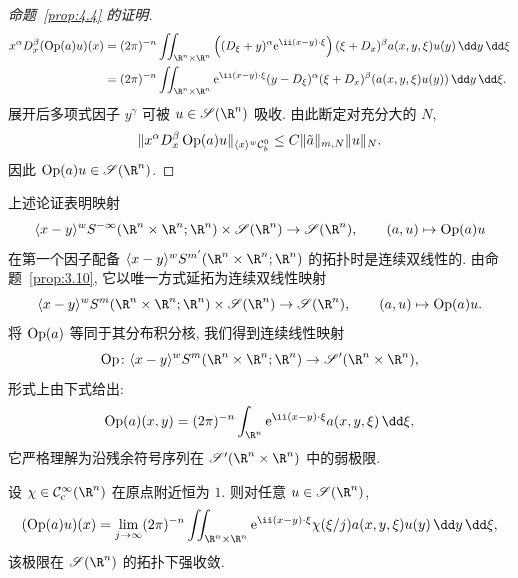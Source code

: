 \begin{proof}[命题~\ref{prop:4.4} 的证明]
\begin{equation}\label{eq:4.21}
    \begin{aligned}
        x^\alpha D_x^\beta (\Op(a) u)(x)
        &= (2\pi)^{-n} \iint_{\R^n \times \R^n} \left( (D_\xi + y)^\alpha \ee^{\ii (x-y) \cdot \xi} \right) (\xi + D_x)^\beta a(x, y, \xi) u(y) \,\dd y \,\dd\xi \\
        &= (2\pi)^{-n} \iint_{\R^n \times \R^n} \ee^{\ii (x-y) \cdot \xi} (y - D_\xi)^\alpha (\xi + D_x)^\beta (a(x, y, \xi) u(y)) \,\dd y \,\dd\xi.
    \end{aligned}
\end{equation}
展开后多项式因子 $y^\gamma$ 可被 $u \in \Schwartz(\R^n)$ 吸收. 由此断定对充分大的 $N$,
\begin{equation}\label{eq:4.22}
    \|x^\alpha D_x^\beta \operatorname{Op}(a) u\|_{\langle x \rangle^w \mathcal{C}_b^0} \le C \|\tilde{a}\|_{m, N} \|u\|_N.
\end{equation}
因此 $\Op(a) u \in \Schwartz(\R^n)$.
\end{proof}

上述论证表明映射
\begin{equation}\label{eq:4.23}
    \langle x - y \rangle^w S^{-\infty}(\R^n \times \R^n; \R^n) \times \Schwartz(\R^n) \to \Schwartz(\R^n), \qquad (a, u) \mapsto \Op(a) u
\end{equation}
在第一个因子配备 $\langle x - y \rangle^w S^{m'}(\R^n \times \R^n; \R^n)$ 的拓扑时是连续双线性的. 由命题~\ref{prop:3.10}, 它以唯一方式延拓为连续双线性映射
\begin{equation}\label{eq:4.24}
    \langle x - y \rangle^w S^m(\R^n \times \R^n; \R^n) \times \Schwartz(\R^n) \to \Schwartz(\R^n), \qquad (a, u) \mapsto \Op(a) u.
\end{equation}
将 $\operatorname{Op}(a)$ 等同于其分布积分核, 我们得到连续线性映射
\begin{equation}\label{eq:4.25}
    \Op \colon \langle x - y \rangle^w S^m(\R^n \times \R^n; \R^n) \to \TempDistr(\R^n \times \R^n),
\end{equation}
形式上由下式给出:
\begin{equation}\label{eq:4.26}
    \Op(a)(x, y) = (2\pi)^{-n} \int_{\R^n} \ee^{\ii (x-y) \cdot \xi} a(x, y, \xi) \,\dd\xi,
\end{equation}
它严格理解为沿残余符号序列在 $\TempDistr(\R^n \times \R^n)$ 中的弱极限.

\begin{remark}[显式切断极限定义]\label{rem:4.6}
设 $\chi \in \SmoothComp(\R^n)$ 在原点附近恒为 $1$. 则对任意 $u \in \Schwartz(\R^n)$,
\begin{equation}\label{eq:4.27}
    (\Op(a) u)(x) = \lim_{j\to\infty} (2\pi)^{-n} \iint_{\R^n \times \R^n} \ee^{\ii(x-y)\cdot\xi} \chi(\xi / j) a(x, y, \xi) u(y) \,\dd y \,\dd\xi,
\end{equation}
该极限在 $\Schwartz(\R^n)$ 的拓扑下强收敛.
\end{remark}

